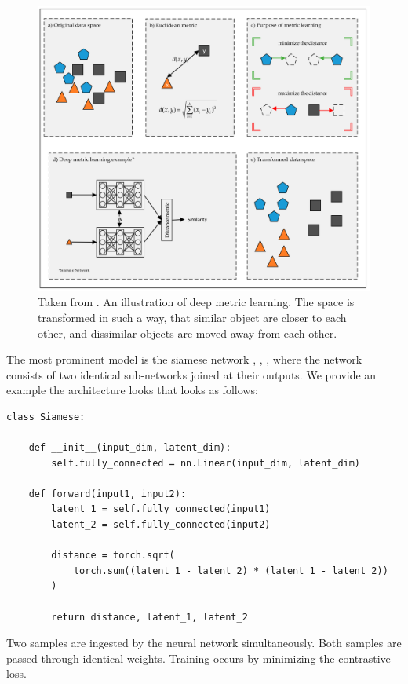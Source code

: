 \documentclass[a4paper,12pt,twoside,openright]{report}
\begin{document}
\begin{figure}[H]
	\center
  \includegraphics[width=\linewidth]{./assets/relatedwork/metric_learning.png}
  \caption{Taken from \cite{kaya19}. An illustration of deep metric learning. The space is transformed in such a way, that similar object are closer to each other, and dissimilar objects are moved away from each other.}
  \label{fig:muse_translation}
\end{figure}

The most prominent model is the siamese network \cite{bromley94}, \cite{chopra05}, \cite{hadsell06}, where the network consists of two identical sub-networks joined at their outputs. 
We provide an example the architecture looks that looks as follows:

\begin{verbatim}
class Siamese:

    def __init__(input_dim, latent_dim):
        self.fully_connected = nn.Linear(input_dim, latent_dim)
        
    def forward(input1, input2):
        latent_1 = self.fully_connected(input1)
        latent_2 = self.fully_connected(input2)
        
        distance = torch.sqrt(
            torch.sum((latent_1 - latent_2) * (latent_1 - latent_2))
        )
        
        return distance, latent_1, latent_2
\end{verbatim}

Two samples are ingested by the neural network simultaneously.
Both samples are passed through identical weights.
Training occurs by minimizing the contrastive loss.
\end{document}
